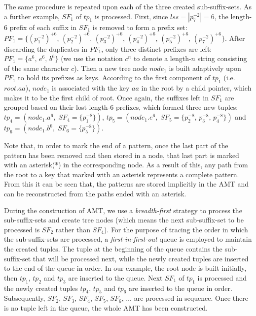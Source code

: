 \documentclass{article}
\begin{document}
The same procedure is repeated upon each of the three created
sub-suffix-sets. As a further example, $SF_1$ of $tp_1$ is
processed. First, since $lss = |p_7^{-2}| = 6$, the length-$6$ prefix
of each suffix in $SF_1$ is removed to form a prefix set:
$PF_1 = \{(p_1^{-2})^{+6},\, (p_2^{-2})^{+6},\, (p_3^{-2})^{+6},\,
(p_4^{-2})^{+6},\, (p_5^{-2})^{+6},\, (p_7^{-2})^{+6}\}$. After
discarding the duplicates in $PF_1$, only three distinct prefixes are
left: $PF_1 = \{a^6,\, e^6,\, b^6\}$ (we use the notation $c^n$ to
denote a length-$n$ string consisting of the same character $c$). Then
a new tree node $node_1$ is built adaptively upon $PF_1$ to hold its
prefixes as keys.  According to the first component of $tp_1$
(i.e. $root.aa$), $node_1$ is associated with the key $aa$ in the root
by a child pointer, which makes it to be the first child of root. Once
again, the suffixes left in $SF_1$ are grouped based on their lost
length-6 prefixes, which formed three new tuples:
$tp_4 = (node_1.a^6,\; SF_4=\{p_1^{-8}\})$,
$tp_5 = (node_1.e^6,\; SF_5=\{p_2^{-8},\, p_3^{-8},\, p_4^{-8}\})$ and
$tp_6 = (node_1.b^6,\; SF_6=\{p_5^{-8}\})$.

Note that, in order to mark the end of a pattern, once the last part
of the pattern has been removed and then stored in a node, that last
part is marked with an asterisk(*) in the corresponding node. As a
result of this, any path from the root to a key that marked with an
asterisk represents a complete pattern. From this it can be seen that,
the patterns are stored implicitly in the AMT and can be reconstructed
from the paths ended with an asterisk.

During the construction of AMT, we use a \emph{breadth-first} strategy
to process the sub-suffix-sets and create tree nodes (which means the
next sub-suffix-set to be processed is $SF_2$ rather than $SF_4$). For
the purpose of tracing the order in which the sub-suffix-sets are
processed, a \emph{first-in-first-out} queue is employed to maintain
the created tuples. The tuple at the beginning of the queue contains
the sub-suffix-set that will be processed next, while the newly
created tuples are inserted to the end of the queue in order. In our
example, the root node is built initially, then $tp_1$, $tp_2$ and
$tp_3$ are inserted to the queue. Next $SF_1$ of $tp_1$ is processed
and the newly created tuples $tp_4$, $tp_5$ and $tp_6$ are inserted to
the queue in order. Subsequently, $SF_2$, $SF_3$, $SF_4$, $SF_5$,
$SF_6$, $\dots$ are processed in sequence. Once there is no tuple left
in the queue, the whole AMT has been constructed.
\end{document}
